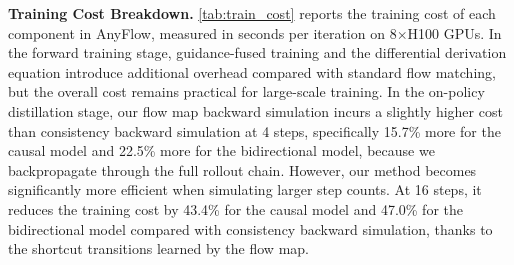 \documentclass{llmxive}
\providecommand{\myPara}[1]{\noindent\textbf{#1}}
\begin{document}
\begin{table}[!tb]
    \centering
      \caption{\textbf{Training Cost Breakdown of AnyFlow.} Costs are measured on Wan2.1-1.3B-T2V with batch size 16 on a node with 8$\times$NVIDIA H100 GPUs. During on-policy distillation, we evaluate the upper-bound cost (comprising one generator and one discriminator update) for the  simulation trajectories.}

    \label{tab:train_cost}
\end{table}
\myPara{Training Cost Breakdown.} \cref{tab:train_cost} reports the training cost of each component in AnyFlow, measured in seconds per iteration on 8$\times$H100 GPUs. In the forward training stage, guidance-fused training and the differential derivation equation introduce additional overhead compared with standard flow matching, but the overall cost remains practical for large-scale training. In the on-policy distillation stage, our flow map backward simulation incurs a slightly higher cost than consistency backward simulation at 4 steps, specifically 15.7\% more for the causal model and 22.5\% more for the bidirectional model, because we backpropagate through the full rollout chain. However, our method becomes significantly more efficient when simulating larger step counts. At 16 steps, it reduces the training cost by 43.4\% for the causal model and 47.0\% for the bidirectional model compared with consistency backward simulation, thanks to the shortcut transitions learned by the flow map.
\end{document}
